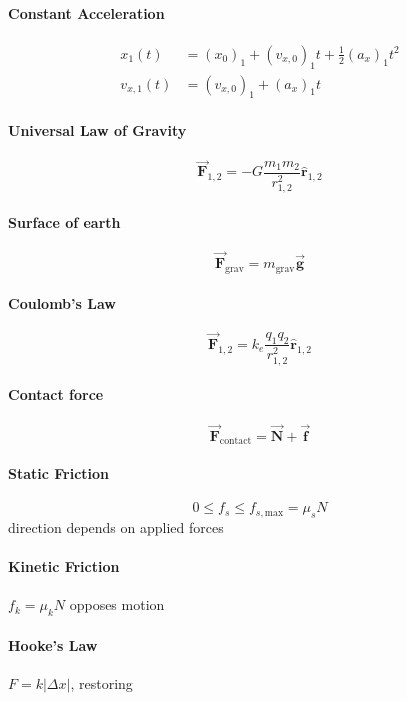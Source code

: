 \documentclass{article}
\let\oldvec=\vec
\let\oldhat=\hat
\renewcommand{\vec}[1]{\oldvec{\boldsymbol{#1}}}
\renewcommand{\hat}[1]{\oldhat{\boldsymbol{#1}}}
\begin{document}
\begin{multicols}{2}
  \paragraph{Constant Acceleration}
    \begin{align*}
      x_1(t) & = (x_0)_1 + (v_{x,0})_1 t + \frac12 (a_x)_1 t^2 \\
      v_{x,1}(t) & = (v_{x,0})_1 + (a_x)_1 t
    \end{align*}
    
  \paragraph{Universal Law of Gravity}
    $$\vec F_{1,2} = -G\frac{m_1m_2}{r_{1,2}^2}\hat r_{1,2}$$
  
  \paragraph{Surface of earth}
    $$\vec F_\text{grav} = m_\text{grav} \vec g$$
  
  \paragraph{Coulomb's Law}
    $$\vec F_{1,2} = k_e \frac{q_1q_2}{r_{1,2}^2} \hat r_{1,2}$$
    
  \paragraph{Contact force}
    $$\vec F_\text{contact} = \vec N + \vec f$$
    
  \paragraph{Static Friction}
    $$0 \le f_s \le f_{s,\text{max}} = \mu_s N$$
    \nopagebreak
    direction depends on applied forces
  \paragraph{Kinetic Friction}
    \begin{center}$f_k = \mu_k N$ opposes motion\end{center}
    
  \paragraph{Hooke's Law}
    \begin{center} $F = k|\Delta x|$, restoring\end{center}
    

\end{multicols}
\end{document}
